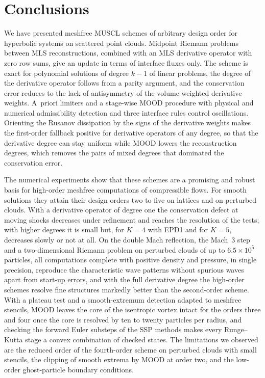 \documentclass[11pt,a4paper]{article}
\numberwithin{equation}{section}
\begin{document}
\section{Conclusions}\label{sec:conclusion}

We have presented meshfree MUSCL schemes of arbitrary design order for hyperbolic systems on scattered point clouds. Midpoint Riemann problems between MLS reconstructions, combined with an MLS derivative operator with zero row sums, give an update in terms of interface fluxes only. The scheme is exact for polynomial solutions of degree $k-1$ of linear problems, the degree of the derivative operator follows from a parity argument, and the conservation error reduces to the lack of antisymmetry of the volume-weighted derivative weights. A~priori limiters and a stage-wise MOOD procedure with physical and numerical admissibility detection and three interface rules control oscillations. Orienting the Rusanov dissipation by the signs of the derivative weights makes the first-order fallback positive for derivative operators of any degree, so that the derivative degree can stay uniform while MOOD lowers the reconstruction degrees, which removes the pairs of mixed degrees that dominated the conservation error.

The numerical experiments show that these schemes are a promising and robust basis for high-order meshfree computations of compressible flows. For smooth solutions they attain their design orders two to five on lattices and on perturbed clouds. With a derivative operator of degree one the conservation defect at moving shocks decreases under refinement and reaches the resolution of the tests; with higher degrees it is small but, for $K=4$ with EPD1 and for $K=5$, decreases slowly or not at all. On the double Mach reflection, the Mach~3 step and a two-dimensional Riemann problem on perturbed clouds of up to $6.5\times10^5$ particles, all computations complete with positive density and pressure, in single precision, reproduce the characteristic wave patterns without spurious waves apart from start-up errors, and with the full derivative degree the high-order schemes resolve fine structures markedly better than the second-order scheme. With a plateau test and a smooth-extremum detection adapted to meshfree stencils, MOOD leaves the core of the isentropic vortex intact for the orders three and four once the core is resolved by ten to twenty particles per radius, and checking the forward Euler substeps of the SSP methods makes every Runge--Kutta stage a convex combination of checked states. The limitations we observed are the reduced order of the fourth-order scheme on perturbed clouds with small stencils, the clipping of smooth extrema by MOOD at order two, and the low-order ghost-particle boundary conditions.
\end{document}
